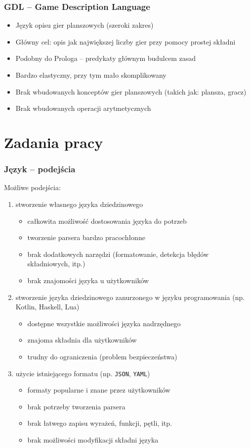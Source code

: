 \documentclass{beamer}
\newcommand\pro{\item[$+$]}
\newcommand\con{\item[$-$]}
\begin{document}
\begin{frame}
	\frametitle{GDL -- Game Description Language\cite{GDL}}
	\begin{itemize}
		\item Język opisu gier planszowych (szeroki zakres)
		\item Główny cel: opis jak największej liczby gier przy pomocy prostej składni
		\item Podobny do Prologa -- predykaty głównym budulcem zasad
		\item Bardzo elastyczny, przy tym mało skomplikowany
		\item Brak wbudowanych konceptów gier planszowych (takich jak: plansza, gracz)
		\item Brak wbudowanych operacji arytmetycznych
	\end{itemize}
\end{frame}

\section{Zadania pracy}

\begin{frame}[allowframebreaks]
	\frametitle{Język -- podejścia}
	Możliwe podejścia:
	\begin{enumerate}
		\item stworzenie własnego języka dziedzinowego
		      \begin{itemize}
			      \pro całkowita możliwość dostosowania języka do potrzeb
			      \con tworzenie parsera bardzo pracochłonne
			      \con brak dodatkowych narzędzi (formatowanie, detekcja błędów składniowych, itp.)
			      \con brak znajomości języka u użytkowników
		      \end{itemize}
		\item stworzenie języka dziedzinowego zanurzonego w języku programowania (np. Kotlin, Haskell, Lua)
		      \begin{itemize}
			      \pro dostępne wszystkie możliwości języka nadrzędnego
			      \pro znajoma składnia dla użytkowników
			      \con trudny do ograniczenia (problem bezpieczeństwa)
		      \end{itemize}
		      \framebreak
		\item użycie istniejącego formatu (np. {\tt JSON}, {\tt YAML})
		      \begin{itemize}
			      \pro formaty popularne i znane przez użytkowników
			      \pro brak potrzeby tworzenia parsera
			      \con brak łatwego zapisu wyrażeń, funkcji, pętli, itp.
			      \con brak możliwości modyfikacji składni języka
		      \end{itemize}
	\end{enumerate}
\end{frame}
\end{document}
